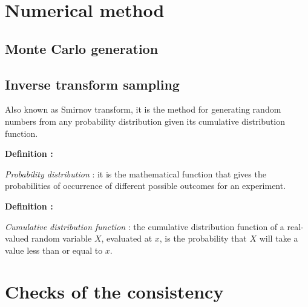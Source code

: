 \documentclass[10pt,a4paper,oneside]{article}
\begin{document}
\begin{multicols}{2}
\newpage
\section{Numerical method}
\subsection{Monte Carlo generation}
\subsection{Inverse transform sampling}
Also known as Smirnov transform, it is the method for generating random numbers from any probability distribution given its cumulative distribution function.


\begin{mdframed}[style = solstyle]
\begin{small}
   \begin{tcolorbox}[colframe=black!5!white]
\textbf{Definition :}  

\textit{Probability distribution} : it is the mathematical function that gives the probabilities of occurrence of different possible outcomes for an experiment.
        \end{tcolorbox}
\end{small}
	\end{mdframed}

\begin{mdframed}[style = solstyle]
\begin{small}
   \begin{tcolorbox}[colframe=black!5!white]
\textbf{Definition :}  

\textit{Cumulative distribution function} : the cumulative distribution function of a real-valued random variable $X$, evaluated at $x$, is the probability that $X$ will take a value less than or equal to $x$.

        \end{tcolorbox}
\end{small}
	\end{mdframed}

\section{Checks of the consistency}


\end{multicols}
\end{document}
